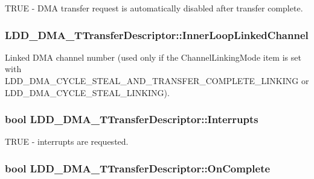 T\-R\-U\-E -\/ D\-M\-A transfer request is automatically disabled after transfer complete. \hypertarget{struct_l_d_d___d_m_a___t_transfer_descriptor_a78eb4ce6c6e05add15799c5389637ce3}{
\subsubsection[{Inner\-Loop\-Linked\-Channel}]{ L\-D\-D\-\_\-\-D\-M\-A\-\_\-\-T\-Transfer\-Descriptor\-::\-Inner\-Loop\-Linked\-Channel}}\label{struct_l_d_d___d_m_a___t_transfer_descriptor_a78eb4ce6c6e05add15799c5389637ce3}
Linked D\-M\-A channel number (used only if the Channel\-Linking\-Mode item is set with L\-D\-D\-\_\-\-D\-M\-A\-\_\-\-C\-Y\-C\-L\-E\-\_\-\-S\-T\-E\-A\-L\-\_\-\-A\-N\-D\-\_\-\-T\-R\-A\-N\-S\-F\-E\-R\-\_\-\-C\-O\-M\-P\-L\-E\-T\-E\-\_\-\-L\-I\-N\-K\-I\-N\-G or L\-D\-D\-\_\-\-D\-M\-A\-\_\-\-C\-Y\-C\-L\-E\-\_\-\-S\-T\-E\-A\-L\-\_\-\-L\-I\-N\-K\-I\-N\-G). \hypertarget{struct_l_d_d___d_m_a___t_transfer_descriptor_a2dd483b9c7608a34cc231114f2642271}{
\subsubsection[{Interrupts}]{\setlength{\rightskip}{0pt plus 5cm}bool L\-D\-D\-\_\-\-D\-M\-A\-\_\-\-T\-Transfer\-Descriptor\-::\-Interrupts}}\label{struct_l_d_d___d_m_a___t_transfer_descriptor_a2dd483b9c7608a34cc231114f2642271}
T\-R\-U\-E -\/ interrupts are requested. \hypertarget{struct_l_d_d___d_m_a___t_transfer_descriptor_a1b9c560066718de0c2e9b5e0c6b2a3c5}{
\subsubsection[{On\-Complete}]{\setlength{\rightskip}{0pt plus 5cm}bool L\-D\-D\-\_\-\-D\-M\-A\-\_\-\-T\-Transfer\-Descriptor\-::\-On\-Complete}}\label{struct_l_d_d___d_m_a___t_transfer_descriptor_a1b9c560066718de0c2e9b5e0c6b2a3c5}
